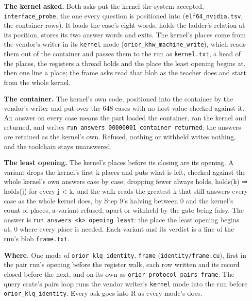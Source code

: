 \textbf{The kernel asked.} Both asks put the kernel the system accepted, \texttt{interface\_\allowbreak{}probe}, the one every question is positioned into (\texttt{elf64\_\allowbreak{}nvidia.\allowbreak{}tsv}, the container rows). It loads the case's eight words, holds the ladder's relation at its position, stores its two answer words and exits. The kernel's places come from the vendor's writer in its \texttt{kernel} mode (\texttt{orior\_\allowbreak{}khw\_\allowbreak{}machine\_\allowbreak{}write}), which reads them out of the container and passes them to the run as \texttt{kernel.\allowbreak{}txt}, a head of the places, the registers a thread holds and the place the least opening begins at, then one line a place; the frame asks read that blob as the teacher does and start from the whole kernel.

\textbf{The container.} The kernel's own code, positioned into the container by the vendor's writer and put over the 648 cases with no host value checked against it. An answer on every case means the part loaded the container, ran the kernel and returned, and writes \texttt{run answers 00000001 container returned}; the answers are retained as the kernel's own. Refused, nothing or withheld writes nothing, and the toolchain stays unanswered.

\textbf{The least opening.} The kernel's places before its closing are its opening. A variant drops the kernel's first k places and puts what is left, checked against the whole kernel's own answers case by case; dropping fewer always holds, holds(k) ⇒ holds(j) for every j < k, and the walk reads the greatest k that still answers every case as the whole kernel does, by Step 9's halving between 0 and the kernel's count of places, a variant refused, apart or withheld by the gate being falsy. The answer is \texttt{run answers <k> opening least}: the place the least opening begins at, 0 where every place is needed. Each variant and its verdict is a line of the run's blob \texttt{frame.\allowbreak{}txt}.

\textbf{Where.} One mode of \texttt{orior\_\allowbreak{}klq\_\allowbreak{}identity}, \texttt{frame} (\texttt{identity/\allowbreak{}frame.\allowbreak{}cu}), first in the pair run's opening before the register walk, each row written and its record closed before the next, and on its own as \texttt{orior protocol pairs frame}. The query crate's pairs loop runs the vendor writer's \texttt{kernel} mode into the run before \texttt{orior\_\allowbreak{}klq\_\allowbreak{}identity}. Every ask goes into R as every mode's does.


